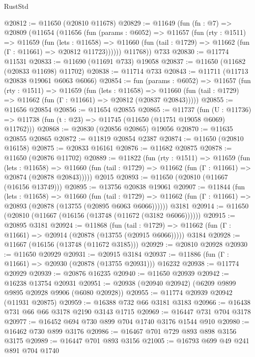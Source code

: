 \begin{lexlean}{RustStd}
\begin{coremodule}
@20812 := @11650 (@20810 @11678)
@20829 := @11649
    (fun (fn : @7) =>
    @20809
      (@11654
        (@11656
          (fun (params : @6052) =>
          @11657
            (fun (rty : @1511) =>
            @11659
              (fun (lets : @11658) =>
              @11660 (fun (tail : @1729) => @11662 (fun (Γ : @11661) => @20812 @11723))))))
        @11768))
    @733
@20830 := @11774 @11531
@20833 := @11690 (@11691 @733) @19058
@20837 := @11650 (@11682 (@20833 @11698) @11702)
@20838 := @11714 @733
@20843 := @11711 (@11713 @20838 @19061 @6063 @6066)
@20854 := fun (params : @6052) =>
  @11657
    (fun (rty : @1511) =>
    @11659
      (fun (lets : @11658) =>
      @11660 (fun (tail : @1729) => @11662 (fun (Γ : @11661) => @20812 (@20837 @20843)))))
@20855 := @11656 @20854
@20856 := @11654 @20855
@20865 := @11737
    (fun (U : @11736) => @11738 (fun (t : @23) => @11745 (@11650 (@11751 @19058 @6069) @11762)))
@20868 := @20830 (@20856 @20865) @19056
@20870 := @11635 @20855 @20865
@20872 := @11819 @20854 @2387
@20874 := @11650 (@20810 @16158)
@20875 := @20833 @16161
@20876 := @11682 @20875
@20878 := @11650 (@20876 @11702)
@20889 := @11822
    (fun (rty : @1511) =>
    @11659
      (fun (lets : @11658) =>
      @11660 (fun (tail : @1729) => @11662 (fun (Γ : @11661) => @20874 (@20878 @20843)))))
    @2015
@20893 := @11650 (@20810 (@11667 (@16156 @13749)))
@20895 := @13756 @20838 @19061
@20907 := @11844
    (fun (lets : @11658) =>
    @11660
      (fun (tail : @1729) =>
      @11662 (fun (Γ : @11661) => @20893 (@20878 (@13755 (@20895 @6063 @6066))))))
    @3181
@20914 := @11650 (@20810 (@11667 (@16156 (@13748 (@11672 (@3182 @6066))))))
@20915 := @20895 @3181
@20924 := @11868
    (fun (tail : @1729) => @11662 (fun (Γ : @11661) => @20914 (@20878 (@13755 (@20915 @6066)))))
    @3184
@20928 := @11667 (@16156 (@13748 (@11672 @3185)))
@20929 := @20810 @20928
@20930 := @11650 @20929
@20931 := @20915 @3184
@20937 := @11886 (fun (Γ : @11661) => @20930 (@20878 (@13755 @20931))) @16232
@20938 := @11774 @20929
@20939 := @20876 @16235
@20940 := @11650 @20939
@20942 := @16238 @13754 @20931
@20951 := @20938 (@20940 @20942) (@6209 @9899 @9895 @20928 @9906 (@6080 @20928))
@20955 := @11774 @20939 @20942 (@11931 @20875)
@20959 := @16388 @732 @66 @3181 @3183
@20966 := @16438 @731 @66 @66 @3178 @2190 @3143 @1715
@20969 := @16447 @731 @704 @3178
@20977 := @16452 @694 @730 @899 @704 @1740 @3176 @1544 @910
@20980 := @16462 @730 @899 @3176
@20986 := @16467 @701 @729 @893 @898 @3156 @3175
@20989 := @16447 @701 @893 @3156
@21005 := @16793
    @699
    @49
    @241
    @891
    @704
    @1740

\end{coremodule}
\end{lexlean}
